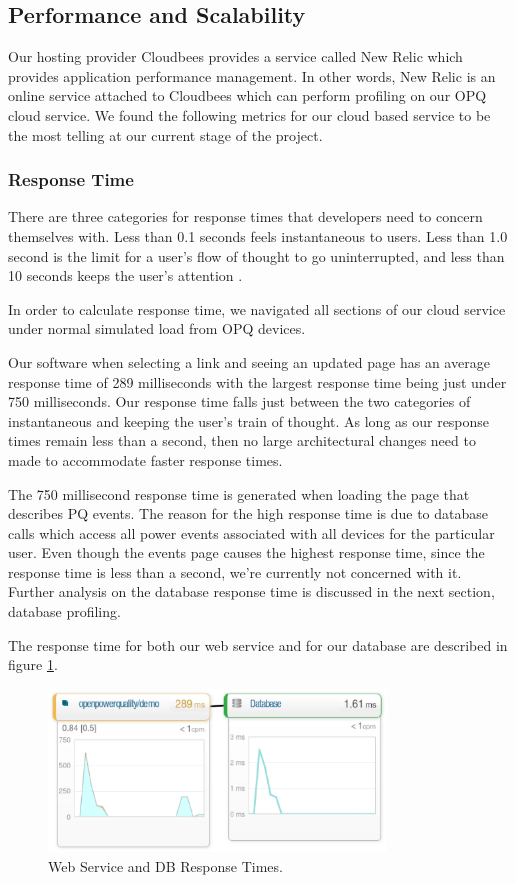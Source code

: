 \documentclass[11pt]{article}
\begin{document}
\subsection{Performance and Scalability}
Our hosting provider Cloudbees provides a service called New Relic which provides application performance management. In other words, New Relic is an online service attached to Cloudbees which can perform profiling on our OPQ cloud service. We found the following metrics for our cloud based service to be the most telling at our current stage of the project.

\subsubsection{Response Time}
There are three categories for response times that developers need to concern themselves with. Less than 0.1 seconds feels instantaneous to users. Less than 1.0 second is the limit for a user's flow of thought to go uninterrupted, and less than 10 seconds keeps the user's attention \cite{response-time}. 

In order to calculate response time, we navigated all sections of our cloud service under normal simulated load from OPQ devices.

Our software when selecting a link and seeing an updated page has an average response time of 289 milliseconds with the largest response time being just under 750 milliseconds. Our response time falls just between the two categories of instantaneous and keeping the user's train of thought. As long as our response times remain less than a second, then no large architectural changes need to made to accommodate faster response times.

The 750 millisecond response time is generated when loading the page that describes PQ events. The reason for the high response time is due to database calls which access all power events associated with all devices for the particular user. Even though the events page causes the highest response time, since the response time is less than a second, we're currently not concerned with it. Further analysis on the database response time is discussed in the next section, database profiling.

The response time for both our web service and for our database are described in figure \ref{fig:response_time}.

\begin{figure}[htbp]
	\centering
	\includegraphics[width=0.8\textwidth]{figures/response_time.eps}
	\caption{Web Service and DB Response Times.}
	\label{fig:response_time}
\end{figure}
\end{document}
